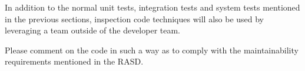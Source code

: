 In addition to the normal unit tests, integration tests and system tests mentioned in the previous sections, inspection code techniques will also be used by leveraging a team outside of the developer team. 

Please comment on the code in such a way as to comply with the maintainability requirements mentioned in the RASD.